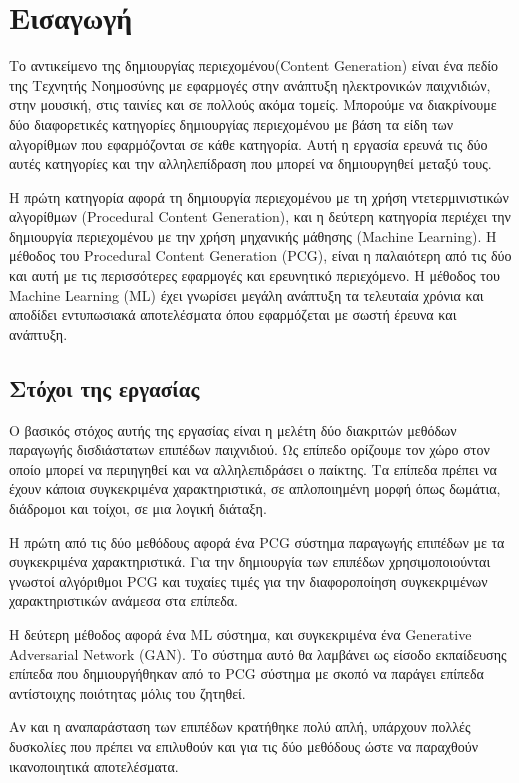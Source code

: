 \chapter{Εισαγωγή}

\par
Το αντικείμενο της δημιουργίας περιεχομένου(Content Generation) είναι ένα πεδίο της Τεχνητής Νοημοσύνης με εφαρμογές στην ανάπτυξη ηλεκτρονικών παιχνιδιών, στην μουσική, στις ταινίες και σε πολλούς ακόμα τομείς. Μπορούμε να διακρίνουμε δύο διαφορετικές κατηγορίες δημιουργίας περιεχομένου με βάση τα είδη των αλγορίθμων που εφαρμόζονται σε κάθε κατηγορία. Αυτή η εργασία ερευνά τις δύο αυτές κατηγορίες και την αλληλεπίδραση που μπορεί να δημιουργηθεί μεταξύ τους.
\par
Η πρώτη κατηγορία αφορά τη δημιουργία περιεχομένου με τη χρήση ντετερμινιστικών αλγορίθμων (Procedural Content Generation), και η δεύτερη κατηγορία περιέχει την δημιουργία περιεχομένου με την χρήση μηχανικής μάθησης (Machine Learning). Η μέθοδος του Procedural Content Generation (PCG), είναι η παλαιότερη από τις δύο και αυτή με τις περισσότερες εφαρμογές και ερευνητικό περιεχόμενο. Η μέθοδος του Machine Learning (ML) έχει γνωρίσει μεγάλη ανάπτυξη τα τελευταία χρόνια και αποδίδει εντυπωσιακά αποτελέσματα όπου εφαρμόζεται με σωστή έρευνα και ανάπτυξη.

\section{Στόχοι της εργασίας}
\par
Ο βασικός στόχος αυτής της εργασίας είναι η μελέτη δύο διακριτών μεθόδων παραγωγής δισδιάστατων επιπέδων παιχνιδιού. Ως επίπεδο ορίζουμε τον χώρο  στον οποίο μπορεί να περιηγηθεί και να αλληλεπιδράσει ο παίκτης. Τα επίπεδα πρέπει να έχουν κάποια συγκεκριμένα χαρακτηριστικά, σε απλοποιημένη μορφή όπως δωμάτια, διάδρομοι και τοίχοι, σε μια λογική διάταξη.
\par
Η πρώτη από τις δύο μεθόδους αφορά ένα PCG σύστημα παραγωγής επιπέδων με τα συγκεκριμένα χαρακτηριστικά. Για την δημιουργία των επιπέδων χρησιμοποιούνται γνωστοί αλγόριθμοι PCG και τυχαίες τιμές για την διαφοροποίηση συγκεκριμένων χαρακτηριστικών ανάμεσα στα επίπεδα.
\par
Η δεύτερη μέθοδος αφορά ένα ML σύστημα, και συγκεκριμένα ένα Generative Adversarial Network (GAN). Το σύστημα αυτό θα λαμβάνει ως είσοδο εκπαίδευσης επίπεδα που δημιουργήθηκαν από το PCG σύστημα με σκοπό να παράγει επίπεδα αντίστοιχης ποιότητας μόλις του ζητηθεί.
\par
Αν και η αναπαράσταση των επιπέδων κρατήθηκε πολύ απλή, υπάρχουν πολλές δυσκολίες που πρέπει να επιλυθούν και για τις δύο μεθόδους ώστε να παραχθούν ικανοποιητικά αποτελέσματα.

